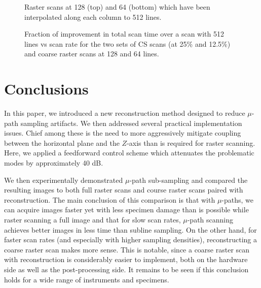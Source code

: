 \documentclass[journal]{IEEEtran}
\begin{document}
\begin{figure}
  \centering
  
  \caption{Raster scans at 128 (top) and 64 (bottom) which have been
    interpolated along each column to 512 lines.}
  \label{fig:results_subline_images}
\end{figure}

\begin{figure}
  \centering
  
  \caption{Fraction of improvement in total scan time over a scan with
    512 lines vs scan rate for the two sets of CS scans (at 25\%
    and 12.5\%) and coarse raster scans at 128 and 64 lines.}
  \label{fig:improve_512}
\end{figure}

\section{Conclusions}\label{sec:conclusions}
In this paper, we introduced a new reconstruction method designed to reduce $\mu$-path
sampling artifacts. We then addressed several practical implementation issues.
Chief among these is the need to more aggressively mitigate coupling between the
horizontal plane and the $Z$-axis than is required for raster scanning. Here, we applied
a feedforward control scheme which attenuates the problematic modes by approximately 40 dB.

We then experimentally demonstrated $\mu$-path sub-sampling
and compared the resulting images to both full raster scans
and course raster scans paired with reconstruction.
The main conclusion of this comparison is that with $\mu$-paths, we
can acquire images faster yet with less specimen damage than is
possible while raster scanning a full image and that for slow scan rates,
$\mu$-path scanning achieves better images in less time than subline sampling.
On the other hand, for faster scan rates (and especially with higher sampling densities), reconstructing a coarse raster scan makes more sense.
This is notable, since a coarse raster scan with reconstruction is considerably
easier to implement, both on the hardware side as well as the post-processing side. 
It remains to be seen if this conclusion holds for a wide range of instruments and specimens.
\end{document}
